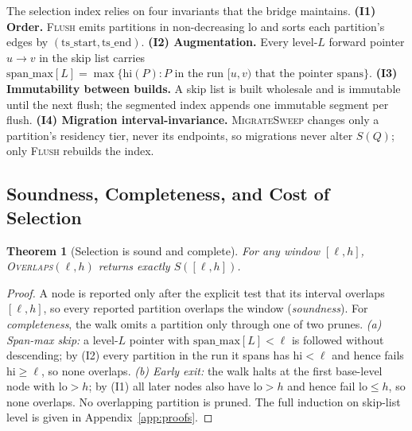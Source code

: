 \documentclass[10pt]{article}
\newtheorem{theorem}{Theorem}
\theoremstyle{definition}
\begin{document}
The selection index relies on four invariants that the bridge maintains.
\textbf{(I1) Order.} \textsc{Flush} emits partitions in non-decreasing
$\mathrm{lo}$ and sorts each partition's edges by
$(\mathrm{ts\_start},\mathrm{ts\_end})$.
\textbf{(I2) Augmentation.} Every level-$L$ forward pointer $u\!\rightarrow\!v$ in
the skip list carries $\mathrm{span\_max}[L]=\max\{\mathrm{hi}(P): P \text{ in the
run } [u,v) \text{ that the pointer spans}\}$.
\textbf{(I3) Immutability between builds.} A skip list is built wholesale and is
immutable until the next flush; the segmented index appends one immutable segment
per flush.
\textbf{(I4) Migration interval-invariance.} \textsc{MigrateSweep} changes only a
partition's residency tier, never its endpoints, so migrations never alter $S(Q)$;
only \textsc{Flush} rebuilds the index.

\subsection{Soundness, Completeness, and Cost of Selection}
\label{sec:selection}

\begin{theorem}[Selection is sound and complete]
\label{thm:sound}
For any window $[\ell,h]$, \textsc{Overlaps}$(\ell,h)$ returns exactly $S([\ell,h])$.
\end{theorem}
\begin{proof}
A node is reported only after the explicit test that its interval overlaps
$[\ell,h]$, so every reported partition overlaps the window (\emph{soundness}). For
\emph{completeness}, the walk omits a partition only through one of two prunes.
\emph{(a) Span-max skip:} a level-$L$ pointer with $\mathrm{span\_max}[L]<\ell$ is
followed without descending; by (I2) every partition in the run it spans has
$\mathrm{hi}<\ell$ and hence fails $\mathrm{hi}\ge\ell$, so none overlaps.
\emph{(b) Early exit:} the walk halts at the first base-level node with
$\mathrm{lo}>h$; by (I1) all later nodes also have $\mathrm{lo}>h$ and hence fail
$\mathrm{lo}\le h$, so none overlaps. No overlapping partition is pruned. The full
induction on skip-list level is given in Appendix~\ref{app:proofs}.
\end{proof}
\end{document}
